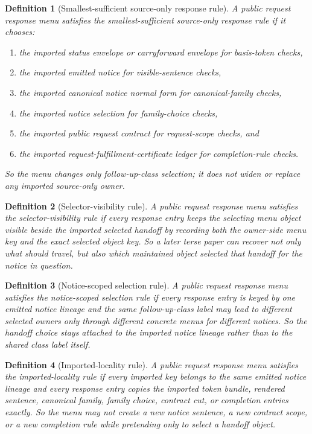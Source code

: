 \documentclass[11pt]{article}
\newtheorem{definition}{Definition}
\begin{document}
\begin{definition}[Smallest-sufficient source-only response rule]
A public request response menu satisfies the \emph{smallest-sufficient source-only response rule} if it chooses:
\begin{enumerate}[leftmargin=*]
\item the imported status envelope or carryforward envelope for basis-token checks,
\item the imported emitted notice for visible-sentence checks,
\item the imported canonical notice normal form for canonical-family checks,
\item the imported notice selection for family-choice checks,
\item the imported public request contract for request-scope checks, and
\item the imported request-fulfillment-certificate ledger for completion-rule checks.
\end{enumerate}
So the menu changes only follow-up-class selection; it does not widen or replace any imported source-only owner.
\end{definition}

\begin{definition}[Selector-visibility rule]
A public request response menu satisfies the \emph{selector-visibility rule} if every response entry keeps the selecting menu object visible beside the imported selected handoff by recording both the owner-side menu key and the exact selected object key. So a later terse paper can recover not only what should travel, but also which maintained object selected that handoff for the notice in question.
\end{definition}

\begin{definition}[Notice-scoped selection rule]
A public request response menu satisfies the \emph{notice-scoped selection rule} if every response entry is keyed by one emitted notice lineage and the same follow-up-class label may lead to different selected owners only through different concrete menus for different notices.
So the handoff choice stays attached to the imported notice lineage rather than to the shared class label itself.
\end{definition}

\begin{definition}[Imported-locality rule]
A public request response menu satisfies the \emph{imported-locality rule} if every imported key belongs to the same emitted notice lineage and every response entry copies the imported token bundle, rendered sentence, canonical family, family choice, contract cut, or completion entries exactly.
So the menu may not create a new notice sentence, a new contract scope, or a new completion rule while pretending only to select a handoff object.
\end{definition}
\end{document}
